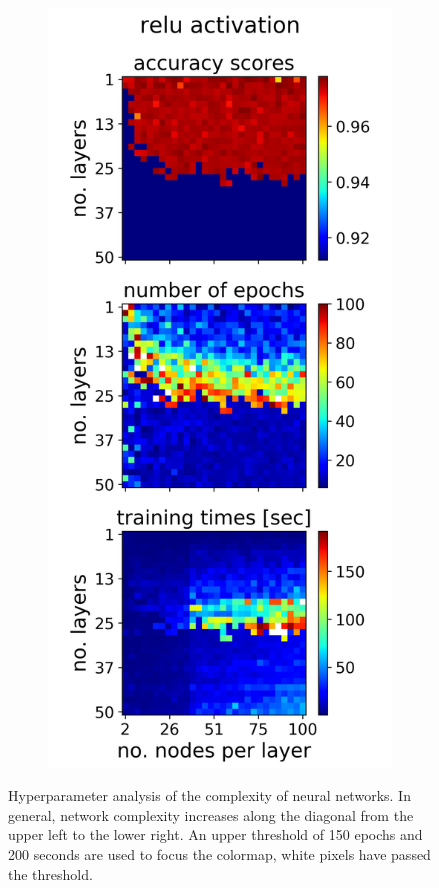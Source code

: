 \documentclass[nofootinbib,reprint,english]{revtex4-1}
\begin{document}
\begin{figure}[h!]
\begin{subfigure}{0.32\textwidth}
	\end{subfigure}
	~
	\begin{subfigure}{0.32\textwidth}
	\centering
	\includegraphics[scale=0.38]{../results/NN/img/gridsearch1_relu1.png}
	\end{subfigure}	
\caption{Hyperparameter analysis of the complexity of neural networks. In general, network complexity increases along the diagonal from the upper left to the lower right. An upper threshold of 150 epochs and 200 seconds are used to focus the colormap, white pixels have passed the threshold.}
\label{fig:NNgridsearch1}
\end{figure}
\end{document}

